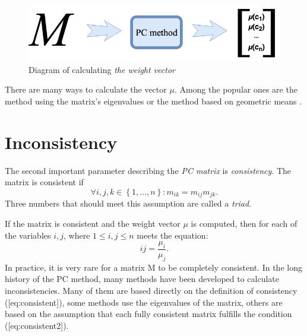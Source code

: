 \begin{figure}[ht]
\centerline{\includegraphics[scale=2.5]{fig1.png}}
\caption{Diagram of calculating \textit{the weight vector}}
\label{fig:fig1}
\end{figure}

There are many ways to calculate the vector $\mu$. Among the popular ones are the method using the matrix's eigenvalues or the method based on geometric means \cite{SAATY1998}.

\section{Inconsistency}
\label{subsec:inconsistency}
The second important parameter describing the \textit{PC matrix} is \textit{consistency}. The matrix is consistent if 
	\begin{equation} 
		\forall i,j,k \in\left\{ 1,\ldots,n\right\} :m_{ik}=m_{ij}m_{jk}.
	\end{equation}
Three numbers that should meet this assumption are called a \textit{triad}.

If the matrix is consistent and the weight vector $\mu$ is computed, then for each of the variables $i,j$, where $1\leq i,j\leq n$ meets the equation: 
	\begin{equation} 
		{ij}=\frac{\mu_{i}}{\mu_{j}}.
 	\end{equation}
In practice, it is very rare for a matrix M to be completely consistent. In the long history of the PC method, many methods have been developed to calculate inconsistencies. Many of them are based directly on the definition of consistency ([eq:consistent]), some methods use the eigenvalues of the matrix, others are based on the assumption that each fully consistent matrix fulfills the condition ([eq:consistent2]).